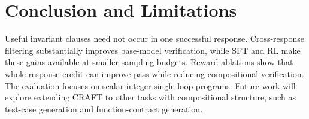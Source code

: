 \section{Conclusion and Limitations}\label{sec:conclusion}

Useful invariant clauses need not occur in one successful response.
Cross-response filtering substantially improves base-model verification,
while SFT and RL make these gains available at smaller sampling budgets.
Reward ablations show that whole-response credit can improve pass while
reducing compositional verification. The evaluation focuses on scalar-integer
single-loop programs. Future work will explore extending CRAFT to other tasks
with compositional structure, such as test-case generation and
function-contract generation.
